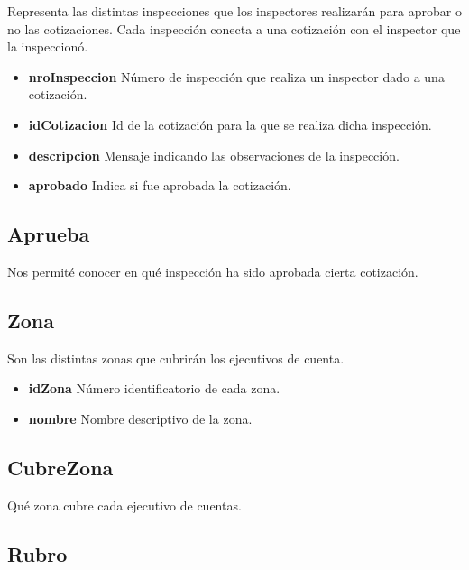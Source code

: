 \documentclass[a4paper,11pt]{article}
\begin{document}
Representa las distintas inspecciones que los inspectores realizarán para aprobar o no las cotizaciones.
Cada inspección conecta a una cotización con el inspector que la inspeccionó.

\begin{itemize}
   
  \item \textbf{nroInspeccion} Número de inspección que realiza un inspector dado a una cotización.
  
  \item \textbf{idCotizacion} Id de la cotización para la que se realiza dicha inspección.
    
  \item \textbf{descripcion} Mensaje indicando las observaciones de la inspección.

  \item \textbf{aprobado} Indica si fue aprobada la cotización.
    
\end{itemize}

\subsection{Aprueba}

Nos permité conocer en qué inspección ha sido aprobada cierta cotización.

\subsection{Zona}

Son las distintas zonas que cubrirán los ejecutivos de cuenta.

\begin{itemize}
   
  \item \textbf{idZona} Número identificatorio de cada zona.
  
  \item \textbf{nombre} Nombre descriptivo de la zona.
  
\end{itemize}

\subsection{CubreZona}

Qué zona cubre cada ejecutivo de cuentas.

\subsection{Rubro}
\end{document}
